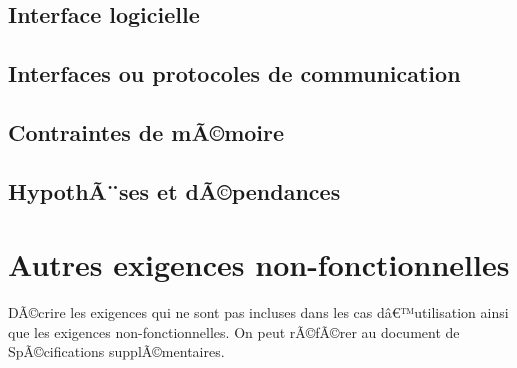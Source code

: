 \documentclass[a4paper, french, 10pt]{report}
\begin{document}
	\subsection{Interface logicielle}

	\subsection{Interfaces ou protocoles de communication}

	\subsection{Contraintes de mÃ©moire}

	\subsection{HypothÃ¨ses et dÃ©pendances}

\section{Autres exigences non-fonctionnelles}

DÃ©crire les exigences qui ne sont pas incluses dans les cas dâ€™utilisation ainsi que les exigences non-fonctionnelles. On peut rÃ©fÃ©rer au document de SpÃ©cifications supplÃ©mentaires.
\end{document}
